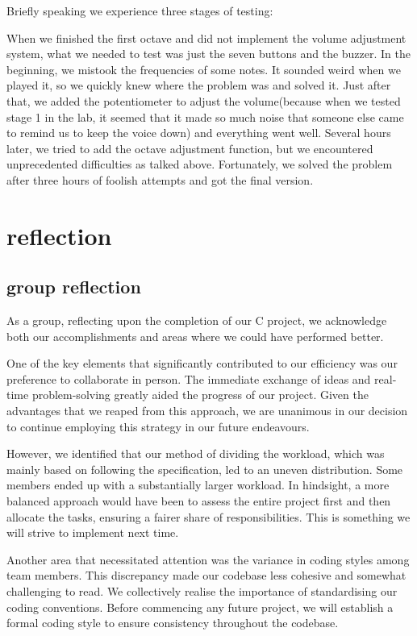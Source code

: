 \documentclass[11pt]{article}
\begin{document}
Briefly speaking we experience three stages of testing:

When we finished the first octave and did not implement the volume adjustment system, what we needed to test was just the seven buttons and the buzzer. In the beginning, we mistook the frequencies of some notes. It sounded weird when we played it, so we quickly knew where the problem was and solved it. Just after that, we added the potentiometer to adjust the volume(because when we tested stage 1 in the lab, it seemed that it made so much noise that someone else came to remind us to keep the voice down) and everything went well. Several hours later, we tried to add the octave adjustment function, but we encountered unprecedented difficulties as talked above. Fortunately, we solved the problem after three hours of foolish attempts and got the final version. 

\section{reflection}

\subsection{group reflection}
As a group, reflecting upon the completion of our C project, we acknowledge both our accomplishments and areas where we could have performed better.

One of the key elements that significantly contributed to our efficiency was our preference to collaborate in person. The immediate exchange of ideas and real-time problem-solving greatly aided the progress of our project. Given the advantages that we reaped from this approach, we are unanimous in our decision to continue employing this strategy in our future endeavours.

However, we identified that our method of dividing the workload, which was mainly based on following the specification, led to an uneven distribution. Some members ended up with a substantially larger workload. In hindsight, a more balanced approach would have been to assess the entire project first and then allocate the tasks, ensuring a fairer share of responsibilities. This is something we will strive to implement next time.

Another area that necessitated attention was the variance in coding styles among team members. This discrepancy made our codebase less cohesive and somewhat challenging to read. We collectively realise the importance of standardising our coding conventions. Before commencing any future project, we will establish a formal coding style to ensure consistency throughout the codebase.
\end{document}
